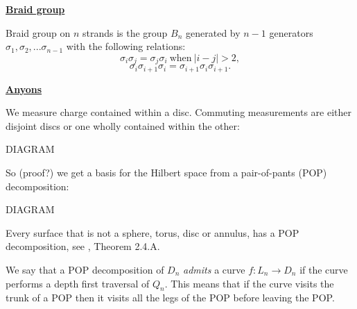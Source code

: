 \documentclass[12pt,a4paper]{article}
\begin{document}
\maketitle

\def\Complex {C}
\def\tensor{\otimes}
\def\Tensor{\bigotimes}
\def\bra #1{\langle #1|}
\def\ket #1{|#1\rangle}
\def\braket #1#2{\langle #1|#2 \rangle}



\def\mathZ{\mathbb{Z}}
\def\mathR{\mathbb{R}}


\def\heading #1{\vskip 20pt \noindent\underline{\large \bf #1}\vskip 5pt}

\def\important #1{\underline{\bf #1}}

%

\heading{Braid group}

Braid group on $n$ strands is the group $B_n$ generated by $n-1$ generators
$\sigma_1, \sigma_2, ... \sigma_{n-1}$ with the following relations:
    $$ \sigma_i \sigma_j = \sigma_j \sigma_i \ \text{when}\ |i-j| > 2, $$
    $$ \sigma_i \sigma_{i+1} \sigma_i =  \sigma_{i+1} \sigma_i \sigma_{i+1}.$$



\heading{Anyons}


We measure charge contained within a disc. %
Commuting measurements are either disjoint discs or
one wholly contained within the other:

DIAGRAM

So (proof?) we get a basis for the Hilbert space from
a pair-of-pants (POP) decomposition:

DIAGRAM

Every surface that is not a sphere, torus, disc or annulus, has
a POP decomposition, see \cite{Ivanov01}, Theorem 2.4.A.

We say that a POP decomposition of $D_n$
{\it admits} a curve $f:L_n\to D_n$
if the curve performs a depth first traversal of $Q_n.$
This means that if the curve visits the trunk of a POP
then it visits all the legs of the POP before leaving the POP.
\end{document}
